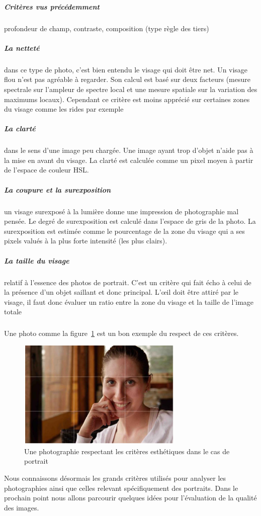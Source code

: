 \documentclass[11pt, french]{report-rd-info}
\begin{document}
\subparagraph{Critères vus précédemment} profondeur de champ, contraste, composition (type règle des tiers)
\subparagraph{La netteté} dans ce type de photo, c'est bien entendu le visage qui doit être net. Un visage flou n'est pas agréable à regarder. Son calcul est basé sur deux facteurs (mesure spectrale sur l’ampleur de spectre local et une mesure spatiale sur la variation des maximums locaux). Cependant ce critère est moins apprécié sur certaines zones du visage comme les rides par exemple
\subparagraph{La clarté} dans le sens d'une image peu chargée. Une image ayant trop d'objet n'aide pas à la mise en avant du visage. La clarté est calculée comme un pixel moyen à partir de l’espace de couleur HSL.
\subparagraph{La coupure et la surexposition} un visage surexposé à la lumière donne une impression de photographie mal pensée. Le degré de  surexposition est calculé dans l’espace de gris de la photo. La surexposition est estimée comme le pourcentage de la zone du visage qui a ses pixels valués à la plus forte intensité (les plus clairs).
\subparagraph{La taille du visage} relatif à l’essence des photos de portrait. C'est un critère qui fait écho à celui de la présence d'un objet saillant et donc principal. L’œil doit être attiré par le visage, il faut donc évaluer un ratio entre la zone du visage et la taille de l’image totale
\subparagraph*{}
Une photo comme la figure~\ref{fig:VisageAgreable} est un bon exemple du respect de ces critères.


\begin{figure}
	\centering
	\includegraphics[width=0.7\textwidth]{Images/ea_visageagreable}
	\caption{Une photographie respectant les critères esthétiques dans le cas de portrait\cite{Males2013}}
	\label{fig:VisageAgreable}
\end{figure}


Nous connaissons désormais les grands critères utilisés pour analyser les photographies ainsi que celles relevant spécifiquement des portraits. Dans le prochain point nous allons parcourir quelques idées pour l'évaluation de la qualité des images.
\end{document}
